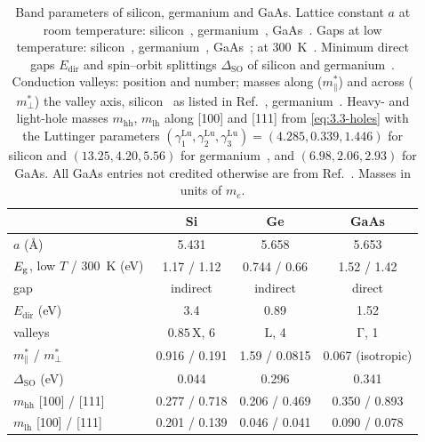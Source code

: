 \begin{table}[tbp]
  \centering
  \caption{Band parameters of silicon, germanium and GaAs. Lattice constant $a$ at room temperature: silicon~\cite[lattice parameter of silicon]{mohr2025codata}, germanium~\cite[Sect.~II\,A]{rideau2006strained}, GaAs~\cite{vurgaftman2001band}. Gaps at low temperature: silicon~\cite[Eq.~(11)]{ramanathan2020ionization}, germanium~\cite[Table~VI]{rideau2006strained}, GaAs~\cite[Table~I]{lucero2012improved}; at \SI{300}{K}~\cite[Table~I]{lucero2012improved}. Minimum direct gaps $E_{\mathrm{dir}}$ and spin--orbit splittings $\Delta_{\mathrm{SO}}$ of silicon and germanium~\cite[Table~II]{rideau2006strained}. Conduction valleys: position and number; masses along ($m^*_\parallel$) and across ($m^*_\perp$) the valley axis, silicon~\cite{hensel1965cyclotron} as listed in Ref.~\cite[Table~VII]{rideau2006strained}, germanium~\cite[Table~VII]{rideau2006strained}. Heavy- and light-hole masses $m_{\mathrm{hh}}$, $m_{\mathrm{lh}}$ along [100] and [111] from \cref{eq:3.3-holes} with the Luttinger parameters $(\gamma^{\mathrm{Lu}}_1, \gamma^{\mathrm{Lu}}_2, \gamma^{\mathrm{Lu}}_3) = (4.285, 0.339, 1.446)$ for silicon and $(13.25, 4.20, 5.56)$ for germanium~\cite[Table~VII]{rideau2006strained}, and $(6.98, 2.06, 2.93)$ for GaAs. All GaAs entries not credited otherwise are from Ref.~\cite{vurgaftman2001band}. Masses in units of $m_e$.}
  \label{tab:3-materials}
  \small
  \begin{tabular}{l ccc}
    \toprule
    & Si & Ge & GaAs \\
    \midrule
    $a$ (\AA) & 5.431 & 5.658 & 5.653 \\
    $E_{\mathrm{g}}$, low $T$ / \SI{300}{K} (eV) & 1.17 / 1.12 & 0.744 / 0.66 & 1.52 / 1.42 \\
    gap & indirect & indirect & direct \\
    $E_{\mathrm{dir}}$ (eV) & 3.4 & 0.89 & 1.52 \\
    valleys & $0.85\,\mathrm{X}$, 6 & $\mathrm{L}$, 4 & $\mathrm{\Gamma}$, 1 \\
    $m^*_\parallel$ / $m^*_\perp$ & 0.916 / 0.191 & 1.59 / 0.0815 & 0.067 (isotropic) \\
    $\Delta_{\mathrm{SO}}$ (eV) & 0.044 & 0.296 & 0.341 \\
    $m_{\mathrm{hh}}$ [100] / [111] & 0.277 / 0.718 & 0.206 / 0.469 & 0.350 / 0.893 \\
    $m_{\mathrm{lh}}$ [100] / [111] & 0.201 / 0.139 & 0.046 / 0.041 & 0.090 / 0.078 \\
    \bottomrule
  \end{tabular}
\end{table}

